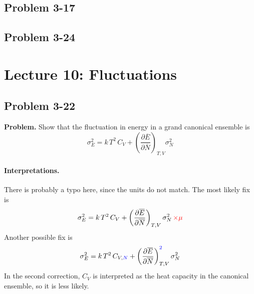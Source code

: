 \documentclass[twocolumn, 10pt]{article}
\numberwithin{equation}{section}
\newenvironment{problem}
{\par\medskip\sffamily \color{problue}
  \textbf{Problem. }\ignorespaces}
{\medskip}
\begin{document}
\subsection{Problem 3-17}

\subsection{Problem 3-24}

\section{Lecture 10: Fluctuations}

\subsection{Problem 3-22}

\begin{problem}
Show that the fluctuation in energy in a grand canonical ensemble is
$$
\sigma_E^2 = k \, T^2 \, C_V
  + \left( \frac{\partial \overline E } { \partial \overline N} \right)_{T, V} \sigma_N^2
$$
\end{problem}

\paragraph*{Interpretations.}

There is probably a typo here, since the units do not match.
%
The most likely fix is
\begin{equation}
  \sigma_E^2 = k \, T^2 \, C_V
  + \left( \frac{\partial \overline E }
                { \partial \overline N} \right)_{T, V}
    \sigma_N^2 \, \textcolor{red}{\times \mu}
  \label{eq:prob3-22a}
\end{equation}
%
Another possible fix is
%
\begin{equation}
  \sigma_E^2 = k \, T^2 \, C_{V,\textcolor{blue}{N}}
  + \left( \frac{\partial \overline E }
                { \partial \overline N} \right)_{T, V}^{\textcolor{blue}{2}}
    \sigma_N^2
  \label{eq:prob3-22b}
\end{equation}
%
In the second correction,
$C_V$ is interpreted as the heat capacity in the canonical ensemble,
so it is less likely.
\end{document}
